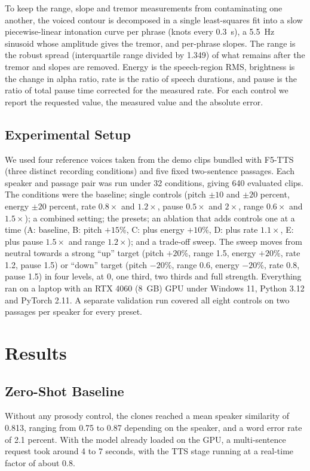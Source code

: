 \documentclass[conference]{IEEEtran}
\begin{document}
To keep the range, slope and tremor measurements from contaminating one another, the voiced
contour is decomposed in a single least-squares fit into a slow piecewise-linear intonation curve per
phrase (knots every 0.3~s), a 5.5~Hz sinusoid whose amplitude gives the tremor, and per-phrase
slopes. The range is the robust spread (interquartile range divided by 1.349) of what remains after
the tremor and slopes are removed. Energy is the speech-region RMS, brightness is the change in alpha
ratio, rate is the ratio of speech durations, and pause is the ratio of total pause time corrected
for the measured rate. For each control we report the requested value, the measured value and the
absolute error.

\subsection{Experimental Setup}
We used four reference voices taken from the demo clips bundled with F5-TTS (three distinct
recording conditions) and five fixed two-sentence passages. Each speaker and passage pair was run
under 32 conditions, giving 640 evaluated clips. The conditions were the baseline; single controls
(pitch $\pm 10$ and $\pm 20$ percent, energy $\pm 20$ percent, rate $0.8\times$ and $1.2\times$,
pause $0.5\times$ and $2\times$, range $0.6\times$ and $1.5\times$); a combined setting; the presets;
an ablation that adds controls one at a time (A: baseline, B: pitch $+15$\%, C: plus energy $+10$\%,
D: plus rate $1.1\times$, E: plus pause $1.5\times$ and range $1.2\times$); and a trade-off sweep. The
sweep moves from neutral towards a strong ``up'' target (pitch $+20$\%, range 1.5, energy $+20$\%,
rate 1.2, pause 1.5) or ``down'' target (pitch $-20$\%, range 0.6, energy $-20$\%, rate 0.8,
pause 1.5) in four levels, at 0, one third, two thirds and full strength. Everything ran on a
laptop with an RTX 4060 (8~GB) GPU under Windows 11, Python 3.12 and PyTorch 2.11. A separate
validation run covered all eight controls on two passages per speaker for every preset.

\section{Results}\label{sec:results}

\subsection{Zero-Shot Baseline}
Without any prosody control, the clones reached a mean speaker similarity of 0.813, ranging from
0.75 to 0.87 depending on the speaker, and a word error rate of 2.1 percent. With the model already
loaded on the GPU, a multi-sentence request took around 4 to 7 seconds, with the TTS stage running
at a real-time factor of about 0.8.
\end{document}
